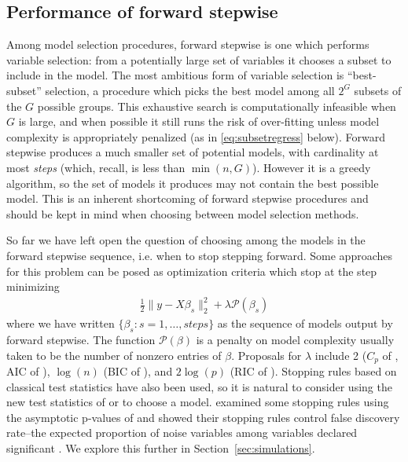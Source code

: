 \documentclass{imsart}
\newcommand{\pen}{\mathcal{P}}
\begin{document}
\subsection{Performance of forward stepwise}

Among model selection procedures, forward stepwise is one which performs
variable selection: from a potentially large set of variables it chooses
a subset to include in the model. The most ambitious form of variable
selection is  ``best-subset'' selection, a procedure which picks the
best model among all $2^G$ subsets of the $G$ possible groups.
This exhaustive search is computationally infeasible when $G$ is
large, and when possible it still
runs the risk of over-fitting unless model complexity is
appropriately penalized (as in \eqref{eq:subsetregress} below).
Forward stepwise produces a much
smaller set of potential models, with cardinality at most
\textit{steps} (which, recall, is less than $\min(n,G)$). However
it is a greedy algorithm, so the set of models it produces may not
contain the best possible model. This is an inherent shortcoming of
forward stepwise procedures and should be kept in mind when choosing
between model selection methods.

So far we have left open the question of choosing among the models in
the forward stepwise sequence, i.e. when to stop stepping
forward. Some approaches for this problem can be posed as optimization
criteria which stop at the step minimizing
\begin{equation}
\begin{aligned}
\label{eq:subsetregress}
\frac{1}{2} \| y - X \beta_s \|_2^2 + \lambda \pen(\beta_s)
\end{aligned}
\end{equation}
where we have written $\{ \beta_s : s = 1, \ldots, steps \}$ as
the sequence of models output by forward stepwise. The function
$\pen(\beta)$ is a penalty on model complexity usually taken to be the
number of nonzero entries of $\beta$. Proposals for $\lambda$ include
2 ($C_p$ of \cite{CP}, AIC of \cite{AIC}), $\log(n)$ (BIC of \cite{BIC}), and
$2\log(p)$ (RIC of \cite{RIC}). Stopping rules based on classical test
statistics have also been used, so it is natural to consider using
the new test statistics of \cite{significance:LASSO} or
\cite{tests:adaptive}
to choose a model. \cite{sequential:fdr} examined some stopping rules
using the asymptotic p-values of \cite{significance:LASSO} and showed
their stopping rules control false discovery rate--the expected
proportion of noise variables among variables declared significant
\citep{fdr}. We explore this further in Section~\ref{sec:simulations}.
\end{document}

